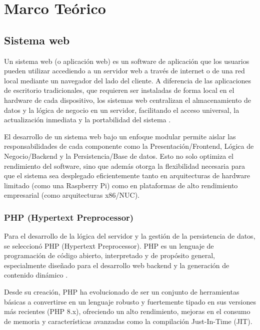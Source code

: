 
\chapter{Marco Teórico}
\label{ch:marcoteorico}



\section{Sistema web}

Un sistema web (o aplicación web) es un software de aplicación que
los usuarios pueden utilizar accediendo a un servidor web a través
de internet o de una red local mediante un navegador del lado del
cliente. A diferencia de las aplicaciones de escritorio tradicionales,
que requieren ser instaladas de forma local en el hardware de cada
dispositivo, los sistemas web centralizan el almacenamiento de datos
y la lógica de negocio en un servidor, facilitando el acceso universal,
la actualización inmediata y la portabilidad del
sistema \parencite{pressman_2020}.

El desarrollo de un sistema web bajo un enfoque modular
permite aislar las responsabilidades de cada componente como
la Presentación/Frontend, Lógica de Negocio/Backend y la
Persistencia/Base de datos.  Esto no solo optimiza el
rendimiento del software, sino
que además otorga la flexibilidad necesaria para que el
sistema sea desplegado eficientemente tanto en arquitecturas
de hardware limitado (como una Raspberry Pi) como en plataformas
de alto rendimiento empresarial (como arquitecturas x86/NUC).

\subsection{PHP (Hypertext Preprocessor)}

Para el desarrollo de la lógica del servidor y la gestión de la
persistencia de datos, se seleccionó PHP (Hypertext Preprocessor).
PHP es un lenguaje de programación de código abierto, interpretado y
de propósito general, especialmente diseñado para el desarrollo web
backend y la generación de contenido dinámico \parencite{php_group_2026}.

Desde su creación, PHP ha evolucionado de ser un conjunto de herramientas
básicas a convertirse en un lenguaje robusto y fuertemente tipado en sus
versiones más recientes (PHP 8.x), ofreciendo un alto rendimiento, mejoras
en el consumo de memoria y características avanzadas como la compilación
Just-In-Time (JIT).

